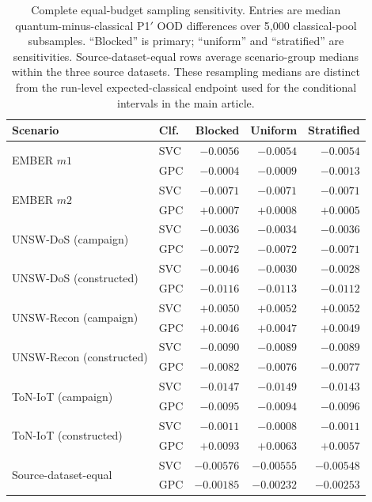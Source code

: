 \documentclass[11pt]{article}
\begin{document}
\begin{table}[ht]
\centering
\caption{Complete equal-budget sampling sensitivity. Entries are median
quantum-minus-classical P1$'$ OOD differences over 5,000 classical-pool
subsamples. ``Blocked'' is primary; ``uniform'' and ``stratified'' are
sensitivities. Source-dataset-equal rows average scenario-group medians within
the three source datasets. These resampling medians are distinct from the
run-level expected-classical endpoint used for the conditional intervals in
the main article.}
\label{supp:tab_budget}
\small
\setlength{\tabcolsep}{4.5pt}
\begin{tabular}{llrrr}
\toprule
Scenario & Clf. & Blocked & Uniform & Stratified \\
\midrule
\multirow{2}{*}{EMBER $m1$}
 & SVC & $-0.0056$ & $-0.0054$ & $-0.0054$ \\
 & GPC & $-0.0004$ & $-0.0009$ & $-0.0013$ \\
\multirow{2}{*}{EMBER $m2$}
 & SVC & $-0.0071$ & $-0.0071$ & $-0.0071$ \\
 & GPC & $+0.0007$ & $+0.0008$ & $+0.0005$ \\
\multirow{2}{*}{UNSW-DoS (campaign)}
 & SVC & $-0.0036$ & $-0.0034$ & $-0.0036$ \\
 & GPC & $-0.0072$ & $-0.0072$ & $-0.0071$ \\
\multirow{2}{*}{UNSW-DoS (constructed)}
 & SVC & $-0.0046$ & $-0.0030$ & $-0.0028$ \\
 & GPC & $-0.0116$ & $-0.0113$ & $-0.0112$ \\
\multirow{2}{*}{UNSW-Recon (campaign)}
 & SVC & $+0.0050$ & $+0.0052$ & $+0.0052$ \\
 & GPC & $+0.0046$ & $+0.0047$ & $+0.0049$ \\
\multirow{2}{*}{UNSW-Recon (constructed)}
 & SVC & $-0.0090$ & $-0.0089$ & $-0.0089$ \\
 & GPC & $-0.0082$ & $-0.0076$ & $-0.0077$ \\
\multirow{2}{*}{ToN-IoT (campaign)}
 & SVC & $-0.0147$ & $-0.0149$ & $-0.0143$ \\
 & GPC & $-0.0095$ & $-0.0094$ & $-0.0096$ \\
\multirow{2}{*}{ToN-IoT (constructed)}
 & SVC & $-0.0011$ & $-0.0008$ & $-0.0011$ \\
 & GPC & $+0.0093$ & $+0.0063$ & $+0.0057$ \\
\midrule
\multirow{2}{*}{Source-dataset-equal}
 & SVC & $-0.00576$ & $-0.00555$ & $-0.00548$ \\
 & GPC & $-0.00185$ & $-0.00232$ & $-0.00253$ \\
\bottomrule
\end{tabular}
\end{table}
\end{document}
